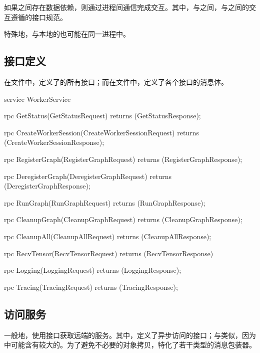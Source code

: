\begin{content}
\begin{content}
\begin{content}
如果之间存在数据依赖，则通过进程间通信完成交互。其中，与之间，与之间的交互遵循的接口规范。

特殊地，与本地的也可能在同一进程中。

\subsection{接口定义}

在文件中，定义了的所有接口；而在文件中，定义了各个接口的消息体。

\begin{leftbar}
\begin{c++}
service WorkerService {
  rpc GetStatus(GetStatusRequest) 
      returns (GetStatusResponse);

  rpc CreateWorkerSession(CreateWorkerSessionRequest)
      returns (CreateWorkerSessionResponse);

  rpc RegisterGraph(RegisterGraphRequest) 
      returns (RegisterGraphResponse);

  rpc DeregisterGraph(DeregisterGraphRequest) 
      returns (DeregisterGraphResponse);

  rpc RunGraph(RunGraphRequest) 
      returns (RunGraphResponse);

  rpc CleanupGraph(CleanupGraphRequest) 
      returns (CleanupGraphResponse);

  rpc CleanupAll(CleanupAllRequest) 
      returns (CleanupAllResponse);

  rpc RecvTensor(RecvTensorRequest) 
      returns (RecvTensorResponse) {
  }

  rpc Logging(LoggingRequest) 
      returns (LoggingResponse);

  rpc Tracing(TracingRequest) 
      returns (TracingResponse);
}
\end{c++}
\end{leftbar}

\subsection{访问服务}

一般地，使用接口获取远端的服务。其中，定义了异步访问的接口；与类似，因为中可能含有较大的。为了避免不必要的对象拷贝，特化了若干类型的消息包装器。


\end{content}
\end{content}
\end{content}
